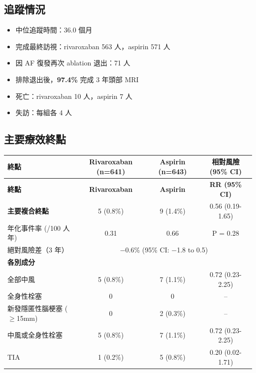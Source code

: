 \documentclass[12pt,a4paper]{article}
\begin{document}
\subsection{追蹤情況}

\begin{itemize}
    \item 中位追蹤時間：36.0 個月
    \item 完成最終訪視：rivaroxaban 563 人，aspirin 571 人
    \item 因 AF 復發再次 ablation 退出：71 人
    \item 排除退出後，\textbf{97.4\%} 完成 3 年頭部 MRI
    \item 死亡：rivaroxaban 10 人，aspirin 7 人
    \item 失訪：每組各 4 人
\end{itemize}

\subsection{主要療效終點}

\begin{longtable}{p{5cm}ccc}
\toprule
\textbf{終點} & \textbf{Rivaroxaban (n=641)} & \textbf{Aspirin (n=643)} & \textbf{相對風險 (95\% CI)} \\
\midrule
\endfirsthead
\toprule
\textbf{終點} & \textbf{Rivaroxaban} & \textbf{Aspirin} & \textbf{RR (95\% CI)} \\
\midrule
\endhead
\bottomrule
\endfoot

\textbf{主要複合終點} & 5 (0.8\%) & 9 (1.4\%) & 0.56 (0.19-1.65) \\
年化事件率 (/100 人年) & 0.31 & 0.66 & P = 0.28 \\
絕對風險差（3 年） & \multicolumn{3}{c}{−0.6\% (95\% CI: −1.8 to 0.5)} \\
\midrule
\textbf{各別成分} & & & \\
全部中風 & 5 (0.8\%) & 7 (1.1\%) & 0.72 (0.23-2.25) \\
全身性栓塞 & 0 & 0 & -- \\
新發隱匿性腦梗塞 ($\geq$15mm) & 0 & 2 (0.3\%) & -- \\
\midrule
中風或全身性栓塞 & 5 (0.8\%) & 7 (1.1\%) & 0.72 (0.23-2.25) \\
TIA & 1 (0.2\%) & 5 (0.8\%) & 0.20 (0.02-1.71) \\
\bottomrule
\end{longtable}

\end{document}
